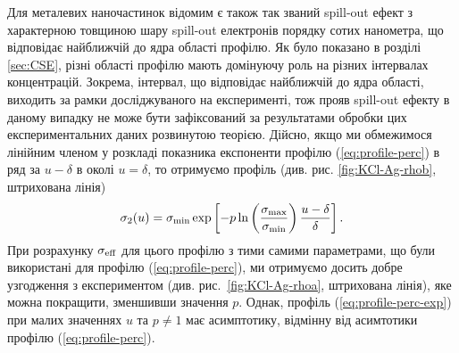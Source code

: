 \documentclass[14pt,twoside]{vakthesis}
\begin{document}
Для металевих наночастинок відомим є також так званий spill-out ефект \cite{Weick2006} з характерною товщиною шару spill-out електронів порядку сотих нанометра, що відповідає найближчій до ядра області профілю. Як було показано в розділі \ref{sec:CSE}, різні області профілю мають домінуючу роль на різних інтервалах концентрацій. Зокрема, інтервал, що відповідає найближчій до ядра області, виходить за рамки досліджуваного на експерименті, тож прояв spill-out ефекту в даному випадку не може бути зафіксований за результатами обробки цих експериментальних даних розвинутою теорією. Дійсно, якщо ми обмежимося лінійним членом у розкладі показника експоненти профілю (\ref{eq:profile-perc}) в ряд за $u-\delta$ в околі
$u=\delta$, то отримуємо профіль (див. рис. \ref{fig:KCl-Ag-rhob}, штрихована лінія)
\begin{equation}\label{eq:profile-perc-exp}
	\sigma_2 (u) = \sigma_{\rm min} \exp \left[ - p \ln \left( \frac{\sigma_{\rm max}}{\sigma_{\rm min}} \right) \frac{u - \delta}{\delta} \right] .
\end{equation}
При розрахунку $\sigma_{\rm eff}$ для цього профілю з тими самими параметрами, що були використані для профілю (\ref{eq:profile-perc}), ми отримуємо досить добре узгодження з експериментом (див. рис.~\ref{fig:KCl-Ag-rhoa}, штрихована лінія), яке можна покращити, зменшивши значення $p$. Однак, профіль (\ref{eq:profile-perc-exp}) при малих значеннях $u$ та $p\neq 1$ має асимптотику, відмінну від асимтотики профілю (\ref{eq:profile-perc}).
\end{document}
